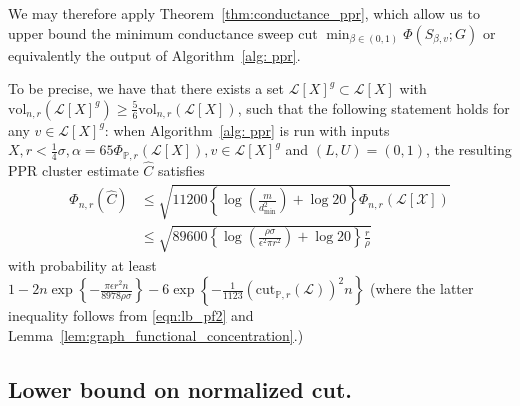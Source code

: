 \documentclass[11pt,twoside]{article}
\theoremstyle{definition}
\newcommand{\set}[1]{\left\{#1\right\}}
\newcommand{\vol}{\mathrm{vol}}
\newcommand{\cut}{\mathrm{cut}}
\newcommand{\1}{\mathbbm{1}}
\newcommand{\Xbf}{X}
\newcommand{\Pbb}{\mathbb{P}}
\newcommand{\Cest}{\widehat{C}}
\begin{document}
We may therefore apply Theorem~\ref{thm:conductance_ppr}, which allow us to upper bound the minimum conductance sweep cut $\min_{\beta \in (0,1)}\Phi(S_{\beta,v};G)$ or equivalently the output of Algorithm~\ref{alg: ppr}.

To be precise, we have that there exists a set $\mathcal{L}[\Xbf]^g \subset \mathcal{L}[\Xbf]$ with $\vol_{n,r}(\mathcal{L}[\Xbf]^g) \geq \frac{5}{6} \vol_{n,r}(\mathcal{L}[\Xbf])$, such that the following statement holds for any $v \in \mathcal{L}[\Xbf]^g$: when Algorithm~\ref{alg: ppr} is run with inputs $\Xbf, r < \frac{1}{4}\sigma,\alpha = 65 \Phi_{\Pbb,r}(\mathcal{L}[\Xbf]),v \in \mathcal{L}[\Xbf]^g$ and $(L,U) = (0,1)$, the resulting PPR cluster estimate $\Cest$ satisfies
\begin{align}
\Phi_{n,r}(\Cest) & \leq \sqrt{11200\left\{\log\left(\frac{m}{d_{\min}^2}\right) + \log 20\right\} \Phi_{n,r}(\mathcal{L[X]})} \nonumber \\
& \leq \sqrt{89600\left\{\log\left(\frac{\rho \sigma}{\epsilon^2 \pi r^2}\right) + \log 20\right\} \frac{r}{\rho}} \label{eqn:lb_pf4} 
\end{align}
with probability at least $1 - 2n\exp\set{-\frac{\pi\epsilon r^2 n}{8978 \rho \sigma}} - 6 \exp\set{-\frac{1}{1123}(\cut_{\Pbb,r}(\mathcal{L}))^2n}$ (where the latter inequality follows from \eqref{eqn:lb_pf2} and Lemma~\ref{lem:graph_functional_concentration}.)

\subsection{Lower bound on normalized cut.}
\end{document}
